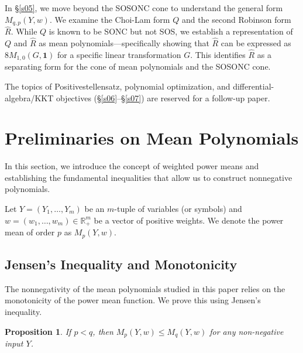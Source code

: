 \documentclass{article}
\newtheorem{proposition}{Proposition}
\begin{document}
In \S\ref{s05}, we move beyond the SOSONC cone to understand the general form $M_{q,p}(Y,w)$. 
We examine the Choi-Lam form $Q$ and the second Robinson form $\hat{R}$. While $Q$ is known to be 
SONC but not SOS, we establish a representation of $Q$ and $\hat{R}$ as mean polynomials---specifically 
showing that $\hat{R}$ can be expressed as $8M_{1,0}(G, \mathbf{1})$ for a specific linear transformation $G$. 
This identifies $\hat{R}$ as a separating form for the cone of mean polynomials and the SOSONC cone.

The topics of Positivestellensatz, polynomial optimization, and differential-algebra/KKT objectives 
(\S\ref{s06}--\S\ref{s07}) are reserved for a follow-up paper.

\section{Preliminaries on Mean Polynomials}\label{s02}

In this section, we introduce the concept of weighted power means and establishing the fundamental 
inequalities that allow us to construct nonnegative polynomials.

Let $Y = (Y_1, \dots, Y_m)$ be an $m$-tuple of variables (or symbols) and $w = (w_1, \dots, w_m) \in \mathbb{R}_+^m$ 
be a vector of positive weights. We denote the power mean of order $p$ as $M_p(Y, w)$.

\subsection{Jensen's Inequality and Monotonicity}

The nonnegativity of the mean polynomials studied in this paper relies on the monotonicity of the power mean function. 
We prove this using Jensen's inequality.

\begin{proposition}\label{prop:Monotonicity}
If $p < q$, then $M_p(Y, w) \le M_q(Y, w)$ for any non-negative input $Y$.
\end{proposition}
\end{document}
